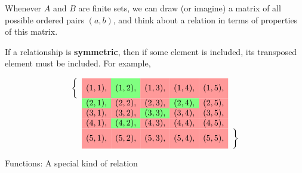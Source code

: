 \documentclass[10pt]{beamer}
\begin{document}
\begin{frame}
\begin{myredbox}[title=Remark]
Whenever $A$ and $B$ are finite sets, we can draw (or imagine) a matrix of all possible ordered pairs $(a,b)$, and think about a relation in terms of properties of this matrix.
\end{myredbox}


\begin{mygreenbox}[title=Example]
If a relationship is \textbf{symmetric}, then if some element is included, its transposed element must be included.  For example, 

    \[
    \begin{array}{ccccccc}
        \bigg\{ &   \cellcolor{red!40} (1,1), & \cellcolor{green!50} (1,2), & \cellcolor{red!40} (1,3), & \cellcolor{red!40} (1,4), & \cellcolor{red!40} (1,5), &\\
         & \cellcolor{green!50} (2,1), & \cellcolor{red!40} (2,2), & \cellcolor{red!40} (2,3), & \cellcolor{green!50} (2,4), & \cellcolor{red!40} (2,5), &\\
        & \cellcolor{red!40} (3,1), & \cellcolor{red!40} (3,2), & \cellcolor{green!50} (3,3), & \cellcolor{red!40} (3,4), & \cellcolor{red!40} (3,5), &\\
        & \cellcolor{red!40} (4,1), & \cellcolor{green!50} (4,2), & \cellcolor{red!40} (4,3), & \cellcolor{red!40} (4,4), & \cellcolor{red!40} (4,5), & \\
        & \cellcolor{red!40} (5,1), & \cellcolor{red!40} (5,2), & \cellcolor{red!40} (5,3), & \cellcolor{red!40} (5,4), & \cellcolor{red!40} (5,5), & \bigg\} \\
    \end{array}
    \]
\end{mygreenbox}

\end{frame}


\begin{frame}[standout]
Functions: A special kind of relation
\end{frame}
\end{document}
